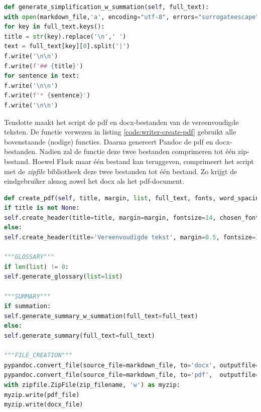 \begin{lstlisting}[language=Python, caption={Een opsomming toevoegen aan het markdownbestand met de Writer-klasse.}, label={code:writer-summation-klasse}]
def generate_simplification_w_summation(self, full_text):
with open(markdown_file,'a', encoding="utf-8", errors="surrogateescape") as f:
for key in full_text.keys():
title = str(key).replace('\n',' ')
text = full_text[key][0].split('|')
f.write('\n\n')
f.write(f'## {title}')
for sentence in text:    
f.write('\n\n')
f.write(f'* {sentence}')
f.write('\n\n')
\end{lstlisting}

Tenslotte maakt het script de pdf en docx-bestanden van de vereenvoudigde teksten. De functie verwezen in listing \ref{code:writer-create-pdf} gebruikt alle bovenstaande (nodige) functies. Daarna genereert Pandoc de pdf en docx-bestanden. Nadien zal de functie deze twee bestanden comprimeren tot één zip-bestand. Hoewel Flask maar één bestand kan teruggeven, comprimeert het script met de \textit{zipfile} bibliotheek deze twee bestanden tot één bestand. Zo krijgt de eindgebruiker alsnog zowel het docx als het pdf-document. 

\begin{lstlisting}[language=Python, caption={Een zip-bestand aanmaken met daarin een docx en pdf bestand van de vereenvoudigde tekst.}, label={code:writer-create-pdf}]
def create_pdf(self, title, margin, list, full_text, fonts, word_spacing, type_spacing, summation):
if title is not None:
self.create_header(title=title, margin=margin, fontsize=14, chosen_font=fonts[0], chosen_title_font=fonts[1], word_spacing=word_spacing, type_spacing=type_spacing)
else:
self.create_header(title='Vereenvoudigde tekst', margin=0.5, fontsize=14, chosen_font=fonts[0], chosen_title_font=fonts[1], word_spacing=word_spacing, type_spacing=type_spacing)

"""GLOSSARY"""
if len(list) != 0:
self.generate_glossary(list=list)

"""SUMMARY"""
if summation:
self.generate_summary_w_summation(full_text=full_text)
else:
self.generate_summary(full_text=full_text)

"""FILE_CREATION"""
pypandoc.convert_file(source_file=markdown_file, to='docx', outputfile=docx_file,   extra_args=["-M2GB", "+RTS", "-K64m", "-RTS"])
pypandoc.convert_file(source_file=markdown_file, to='pdf',  outputfile=pdf_file,    extra_args=['--pdf-engine=xelatex'])
with zipfile.ZipFile(zip_filename, 'w') as myzip:
myzip.write(pdf_file)
myzip.write(docx_file)
\end{lstlisting}

